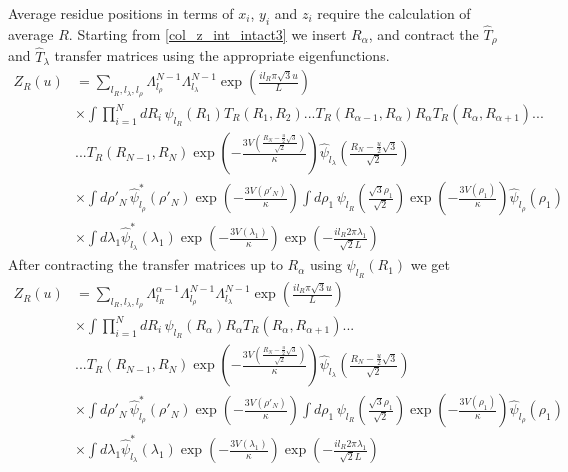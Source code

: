 Average residue positions in terms of $x_{i}$, $y_{i}$ and $z_{i}$ require the calculation of average $R$. Starting from \eqref{col_z_int_intact3} we insert $R_{\alpha}$, and contract the $\hat{T}_{\rho}$ and $\hat{T}_{\lambda}$ transfer matrices using the appropriate eigenfunctions. 
%
\begin{equation}\label{col_har_mxd_r_1}
\begin{split}
Z_{R}\left(u\right) &=\sum_{l_R,l_\lambda,l_\rho}\Lambda_{l_\rho}^{N-1}\Lambda_{l_\lambda}^{N-1}\exp\left(\frac{il_{R}\pi \sqrt{3}u}{L}\right)\\
&\times\int\prod^{N}_{i=1}dR_i\,\psi_{l_R}\left(R_{1}\right)T_{R}\left(R_{1},R_{2}\right)...T_{R}\left(R_{\alpha-1},R_{\alpha}\right)R_{\alpha}T_{R}\left(R_{\alpha},R_{\alpha+1}\right)...\\
&...T_{R}\left(R_{N-1},R_{N}\right)\exp\left(-\frac{3V(\frac{R_N-\frac{u}{2}\sqrt{3}}{\sqrt{2}})}{\kappa}\right)\hat{\psi}_{l_\lambda}\left(\frac{R_N-\frac{u}{2}\sqrt{3}}{\sqrt{2}}\right)\\
&\times\int d\rho'_N\,\hat{\psi}^{*}_{l_\rho}\left(\rho'_{N}\right)\exp\left(-\frac{3V(\rho'_{N})}{\kappa}\right)\int d\rho_1\,\psi_{l_R}\left( \frac{\sqrt{3}\rho_1}{\sqrt{2}}\right)\exp\left(-\frac{3V(\rho_{1})}{\kappa}\right)\hat{\psi}_{l_\rho}\left(\rho_{1}\right)\\
&\times\int d\lambda_1\hat{\psi}^{*}_{l_\lambda}\left(\lambda_{1}\right)\exp\left(-\frac{3V(\lambda_{1})}{\kappa}\right)\exp\left(-\frac{il_{R}2\pi\lambda_1}{\sqrt{2}L} \right)
\end{split}
\end{equation}
%
After contracting the transfer matrices up to $R_{\alpha}$ using $\psi_{l_R}\left(R_{1}\right)$ we get
%
\begin{equation}\label{col_har_mxd_r_2}
\begin{split}
Z_{R}\left(u\right) &=\sum_{l_R,l_\lambda,l_\rho}\Lambda_{l_R}^{\alpha-1}\Lambda_{l_\rho}^{N-1}\Lambda_{l_\lambda}^{N-1}\exp\left(\frac{il_{R}\pi \sqrt{3}u}{L}\right)\\
&\times\int\prod^{N}_{i=1}dR_i\,\psi_{l_R}\left(R_{\alpha}\right)R_{\alpha}T_{R}\left(R_{\alpha},R_{\alpha+1}\right)...\\
&...T_{R}\left(R_{N-1},R_{N}\right)\exp\left(-\frac{3V(\frac{R_N-\frac{u}{2}\sqrt{3}}{\sqrt{2}})}{\kappa}\right)\hat{\psi}_{l_\lambda}\left(\frac{R_N-\frac{u}{2}\sqrt{3}}{\sqrt{2}}\right)\\
&\times\int d\rho'_N\,\hat{\psi}^{*}_{l_\rho}\left(\rho'_{N}\right)\exp\left(-\frac{3V(\rho'_{N})}{\kappa}\right)\int d\rho_1\,\psi_{l_R}\left( \frac{\sqrt{3}\rho_1}{\sqrt{2}}\right)\exp\left(-\frac{3V(\rho_{1})}{\kappa}\right)\hat{\psi}_{l_\rho}\left(\rho_{1}\right)\\
&\times\int d\lambda_1\hat{\psi}^{*}_{l_\lambda}\left(\lambda_{1}\right)\exp\left(-\frac{3V(\lambda_{1})}{\kappa}\right)\exp\left(-\frac{il_{R}2\pi\lambda_1}{\sqrt{2}L} \right)
\end{split}
\end{equation} 
